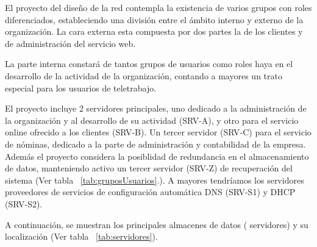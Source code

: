 \documentclass[a4paper,onecolumn,11pt]{article}
\begin{document}
El proyecto del diseño de la red contempla la existencia de varios 
grupos con roles diferenciados,
estableciendo una división entre el ámbito interno y externo de la 
organización. La cara externa     
esta compuesta por dos partes la de los clientes y de 
administración del servicio web.

La parte interna constará de tantos grupos de usuarios como roles 
haya en el desarrollo de la actividad de la organización, contando 
a mayores un trato especial para los usuarios de teletrabajo.


El proyecto incluye 2 servidores principales, uno dedicado a la administración de la organización y al desarrollo de su actividad (SRV-A), 
y otro para el servicio online ofrecido a los clientes (SRV-B). Un tercer servidor (SRV-C) para el servicio de nóminas, dedicado a la parte de administración y contabilidad de la empresa. Además el proyecto considera la posiblidad de redundancia 
en el almacenamiento de datos, manteniendo activo un tercer servidor (SRV-Z) de recuperación del sistema (Ver tabla ~\ref{tab:gruposUsuarios}.). A mayores tendríamos los servidores proveedores de servicios de configuración automática DNS (SRV-S1) y DHCP (SRV-S2).

A continuación, se muestran los principales almacenes de datos (
servidores) y su localización (Ver tabla ~\ref{tab:servidores}).
\end{document}

